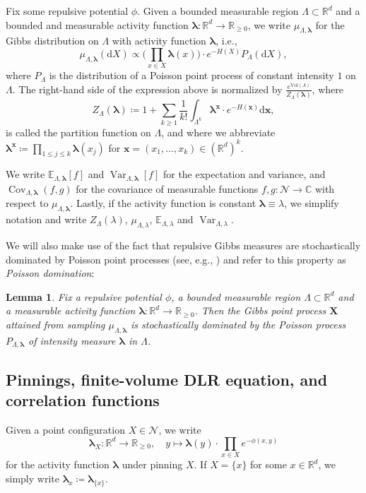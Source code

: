 \documentclass[10pt]{amsart}
\newtheorem{lemma}[theorem]{Lemma}
\theoremstyle{definition}
\theoremstyle{remark}
\newcommand{\pointsets}{\mathcal{N}}
\newcommand{\bX}{\mathbf{X}}
\newcommand{\blambda}{{\boldsymbol{\lambda}}}
\newcommand{\E}{\mathbb{E}}
\newcommand{\R}{\mathbb{R}}
\newcommand{\C}{\mathbb{C}}
\newcommand{\region}{\Lambda}
\newcommand{\potential}{\phi}
\newcommand{\activity}{\lambda}
\newcommand{\activities}{\pmb{\lambda}}
\newcommand{\diff}{\mathrm{d}}
\newcommand{\vol}{\mathrm{Vol}}
\newcommand{\V}[1]{\mathbf{#1}}
\newcommand{\Var}{{\operatorname{Var}}}
\newcommand{\Cov}{\operatorname{Cov}}
\begin{document}
	
	Fix some repulsive potential $\potential$.
	Given a bounded measurable region $\region \subset \R^d$ and a bounded and measurable activity function $\activities: \R^d \to \R_{\ge 0}$, we write $\mu_{\region, \activities}$ for the Gibbs distribution on $\region$ with activity function $\activities$, i.e.,
	\[
	\mu_{\region, \activities} (\diff X) \propto \bigg(\prod_{x \in X} \activities(x)\bigg) \cdot e^{-H(X)} P_{\region}(\diff X),
	\]
	where $P_{\region}$ is the distribution of a Poisson point process of constant intensity $1$ on $\region$.
	The right-hand side of the expression above is normalized by $\frac{e^{\vol(\region)}}{Z_{\region}(\activities)}$, where 
	\[
	Z_{\region}(\activities) \coloneqq 1 + \sum_{k \ge 1} \frac{1}{k!} \int_{\region^k} \activities^{\V{x}} \cdot e^{-H(\V{x})} \diff \V{x} ,
	\]
	is called the partition function on $\region$, and where we abbreviate $\activities^{\V{x}} \coloneqq \prod_{1 \le j \le k} \activities(x_j)$ for $\V{x} = (x_1, \dots, x_k) \in (\R^d)^k$.
	
	We write $\E_{\region, \activities}[f]$ and $\Var_{\region, \activities}[f]$ for the expectation and variance, and $\Cov_{\region, \activities}(f, g)$ for the covariance of measurable functions $f, g : \pointsets \to \C$ with respect to $\mu_{\region, \activities}$. 
	Lastly, if the activity function is constant $\activities \equiv \activity$, we simplify notation and write $Z_{\region}(\activity)$, $\mu_{\region, \activity}$, $\E_{\region, \activity}$ and $\Var_{\region, \activity}$.
	
	
	We will also make use of the fact that repulsive Gibbs measures are stochastically dominated by Poisson point processes (see, e.g., \cite[Lemma 2]{dereudre2019introduction}) and refer to this property as \emph{Poisson domination}: 
	
	\begin{lemma}\label{lem:Poisson-domination}
		Fix a repulsive potential $\phi$, a bounded measurable region $\Lambda \subset \R^d$ and a measurable activity function $\blambda : \R^d \to \R_{\geq0}$.  Then the Gibbs point process $\bX$ attained from sampling $\mu_{\Lambda,\blambda}$ is stochastically dominated by the Poisson process $P_{\Lambda,\blambda}$ of intensity measure $\blambda$ in $\Lambda$.
	\end{lemma}
	
	
	\subsection{Pinnings, finite-volume DLR equation, and correlation functions} \label{sec:pinnings}
	Given a point configuration $X \in \pointsets$, we write 
	\[
	\activities_X: \R^d \to \R_{\ge 0}, \quad y \mapsto \activities(y) \cdot \prod_{x \in X} e^{-\potential(x, y)}
	\]
	for the activity function $\activities$ under pinning $X$.
	If $X = \{x\}$ for some $x \in \R^d$, we simply write $\activities_x \coloneqq \activities_{\{x\}}$.
	
\end{document}
